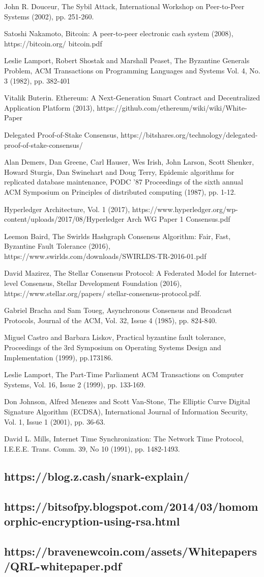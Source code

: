\documentclass[11pt]{article}
\begin{document}
John R. Douceur, The Sybil Attack, International Workshop on Peer-to-Peer Systems (2002), pp. 251-260.


Satoshi Nakamoto, Bitcoin: A peer-to-peer electronic cash system (2008), https://bitcoin.org/ bitcoin.pdf


Leslie Lamport, Robert Shostak and Marshall Peaset, The Byzantine Generals Problem, ACM Transactions on Programming Languages and Systems Vol. 4, No. 3 (1982), pp. 382-401


Vitalik Buterin. Ethereum: A Next-Generation Smart Contract and Decentralized Application Platform (2013), https://github.com/ethereum/wiki/wiki/White-Paper


Delegated Proof-of-Stake Consensus, https://bitshares.org/technology/delegated-proof-of-stake-consensus/


Alan Demers, Dan Greene, Carl Hauser, Wes Irish, John Larson, Scott Shenker, Howard Sturgis, Dan Swinehart and Doug Terry, Epidemic algorithms for replicated database maintenance, PODC '87 Proceedings of the sixth annual ACM Symposium on Principles of distributed computing (1987), pp. 1-12.


Hyperledger Architecture, Vol. 1 (2017), https://www.hyperledger.org/wp-content/uploads/2017/08/Hyperledger Arch WG Paper 1 Consensus.pdf


Leemon Baird, The Swirlds Hashgraph Consensus Algorithm: Fair, Fast, Byzantine Fault Tolerance (2016), https://www.swirlds.com/downloads/SWIRLDS-TR-2016-01.pdf


David Mazirez, The Stellar Consensus Protocol: A Federated Model for Internet- level Consensus, Stellar Development Foundation (2016), https://www.stellar.org/papers/ stellar-consensus-protocol.pdf.


Gabriel Bracha and Sam Toueg, Asynchronous Consensus and Broadcast Protocols, Journal of the ACM, Vol. 32, Issue 4 (1985), pp. 824-840.


Miguel Castro and Barbara Liskov, Practical byzantine fault tolerance, Proceedings of the 3rd Symposium on Operating Systems Design and Implementation (1999), pp.173186.


Leslie Lamport, The Part-Time Parliament ACM Transactions on Computer Systems, Vol. 16, Issue 2 (1999), pp. 133-169.


Don Johnson, Alfred Menezes and Scott Van-Stone, The Elliptic Curve Digital Signature Algorithm (ECDSA), International Journal of Information Security, Vol. 1, Issue 1 (2001), pp. 36-63.


David L. Mills, Internet Time Synchronization: The Network Time Protocol, I.E.E.E. Trans. Comm. 39, No 10 (1991), pp. 1482-1493.


\subsection{https://blog.z.cash/snark-explain/}

\subsection{https://bitsofpy.blogspot.com/2014/03/homomorphic-encryption-using-rsa.html}

\subsection{https://bravenewcoin.com/assets/Whitepapers/QRL-whitepaper.pdf}
\end{document}
